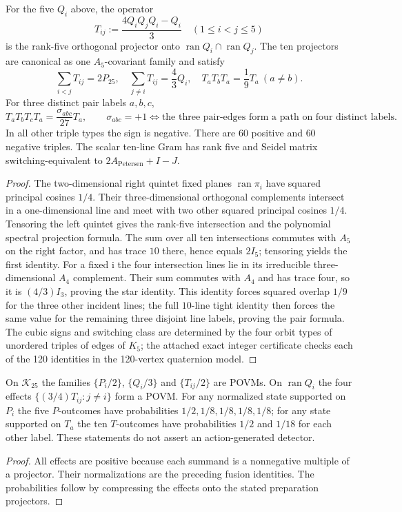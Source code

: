 \documentclass[11pt]{article}
\begin{document}
\begin{theorem}
\label{p1b:thm:unmarked-ten-pair-five-planes}
For the five $Q_i$ above, the operator
\[
  T_{ij}:=\frac{4Q_iQ_jQ_i-Q_i}{3}\quad(1\le i<j\le5)
\]
is the rank-five orthogonal projector onto
$\operatorname{ran}Q_i\cap\operatorname{ran}Q_j$.  The ten projectors
are canonical as one $A_5$-covariant family and satisfy
\[
 \sum_{i<j}T_{ij}=2P_{25},\quad
 \sum_{j\ne i}T_{ij}=\frac43Q_i,\quad
 T_aT_bT_a=\frac19T_a\ (a\ne b).
\]
For three distinct pair labels $a,b,c$,
\[
 T_aT_bT_cT_a=\frac{\sigma_{abc}}{27}T_a,
 \qquad\sigma_{abc}=+1
 \iff\text{the three pair-edges form a path on four distinct labels}.
\]
In all other triple types the sign is negative.  There are $60$
positive and $60$ negative triples.  The scalar ten-line Gram has rank
five and Seidel matrix switching-equivalent to
$2A_{\mathrm{Petersen}}+I-J$.
\end{theorem}
\begin{proof}
The two-dimensional right quintet fixed planes $\operatorname{ran}\pi_i$
have squared principal cosines $1/4$.  Their three-dimensional
orthogonal complements intersect in a one-dimensional line and meet
with two other squared principal cosines $1/4$.  Tensoring the left
quintet gives the rank-five intersection and the polynomial spectral
projection formula.  The sum over all ten intersections commutes with
$A_5$ on the right factor, and has trace $10$ there, hence equals
$2I_5$; tensoring yields the first identity.  For a fixed i the four
intersection lines lie in its irreducible three-dimensional $A_4$
complement.  Their sum commutes with $A_4$ and has trace four, so it
is $(4/3)I_3$, proving the star identity.  This identity forces
squared overlap $1/9$ for the three other incident lines; the full
$10$-line tight identity then forces the same value for the remaining
three disjoint line labels, proving the pair formula.  The cubic signs and
switching class are determined by the four orbit types of unordered
triples of edges of $K_5$; the attached exact integer certificate
checks each of the 120 identities in the 120-vertex quaternion model.
\end{proof}

\begin{corollary}
\label{p1b:cor:unmarked-pair-povms}
On $\mathcal K_{25}$ the families
$\{P_i/2\}$, $\{Q_i/3\}$ and $\{T_{ij}/2\}$ are POVMs.
On $\operatorname{ran}Q_i$ the four effects
$\{(3/4)T_{ij}:j\ne i\}$ form a POVM.  For any normalized state
supported on $P_i$ the five $P$-outcomes have probabilities
$1/2,1/8,1/8,1/8,1/8$; for any state supported on $T_a$ the ten
$T$-outcomes have probabilities $1/2$ and $1/18$ for each other label.
These statements do not assert an action-generated detector.
\end{corollary}
\begin{proof}
All effects are positive because each summand is a nonnegative
multiple of a projector.  Their normalizations are the preceding
fusion identities.  The probabilities follow by compressing the
effects onto the stated preparation projectors.
\end{proof}
\end{document}
